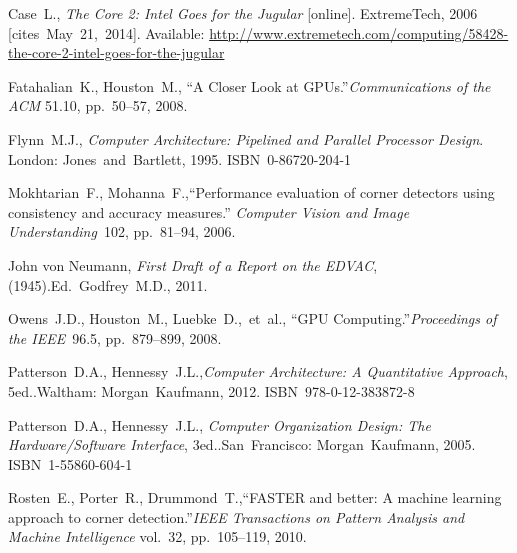 {\raggedright
	\begin{thebibliography}{99}
		
			Case~L.,
			\textit{The Core 2: Intel Goes for the Jugular} [online].
			ExtremeTech, 2006 [cites~May~21,~2014].
			Available: \url{http://www.extremetech.com/computing/58428-the-core-2-intel-goes-for-the-jugular}
		
			Fatahalian~K., Houston~M.,
			``A Closer Look at GPUs.''\linebreak[1]
			\textit{Communications of the ACM} 51.10, pp.~50--57, 2008.
		
			Flynn~M.J.,
			\textit{Computer Architecture: Pipelined and Parallel Processor Design}.
			\linebreak[3]
			London: Jones~and~Bartlett, 1995. ISBN~0-86720-204-1
		
			Mokhtarian~F., Mohanna~F.,\linebreak[1]
			``Performance evaluation of corner detectors using
			consistency and accuracy measures.''
			\textit{Computer Vision and Image Understanding}~102, pp.~81--94, 2006.
		
			John von Neumann,
			\textit{First Draft of a Report on the EDVAC}, (1945).\linebreak[2]
			Ed.~Godfrey~M.D., 2011.
		
			Owens~J.D., Houston~M., Luebke~D.,~et~al.,
			``GPU Computing.''\linebreak[1]
			\textit{Proceedings of the IEEE}~96.5, pp.~879--899,
			2008.
		
			Patterson~D.A., Hennessy~J.L.,\linebreak[1]
			\textit{Computer Architecture: A Quantitative Approach},
				5\nth ed..\linebreak[1]
			Waltham: Morgan~Kaufmann, 2012. ISBN~978-0-12-383872-8
		
			Patterson~D.A., Hennessy~J.L., \linebreak[1]
			\textit{Computer Organization Design: %
				The Hardware/Software Interface}, 3\rd ed..\linebreak[1]
			San~Francisco: Morgan~Kaufmann, 2005. ISBN~1-55860-604-1
		
			Rosten~E., Porter~R., Drummond~T.,\linebreak[1]
			``FASTER and better: A machine learning approach to corner detection.''\linebreak[1]
			\textit{IEEE Transactions on Pattern Analysis and Machine Intelligence} vol.~32,
			pp.~105--119, 2010.
		

\end{thebibliography}}
